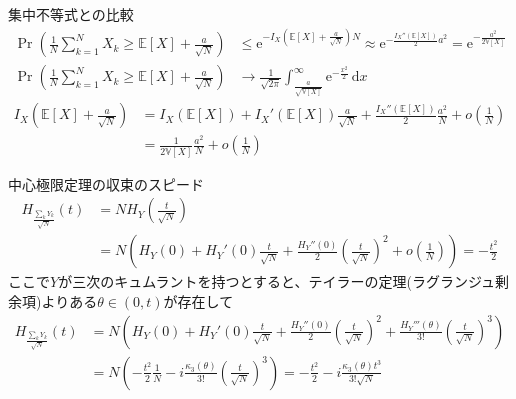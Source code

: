 \documentclass[lualatex,handout]{beamer}
\newcommand{\expt}[1]{\mathbb{E}\left[#1\right]}
\newcommand{\var}[1]{\mathbb{V}\left[#1\right]}
\newcommand\dx{{\,\mathrm{d}x}}
\theoremstyle{definition}
\begin{document}
\begin{frame}{集中不等式との比較}
\begin{align*}
\Pr\left(\frac1N\sum_{k=1}^N X_k\ge \expt{X} + \frac{a}{\sqrt{N}}\right) &\le \mathrm{e}^{-I_X\left(\expt{X}+\frac{a}{\sqrt{N}}\right)N}
\approx \mathrm{e}^{-\frac{I_X''(\expt{X})}2 a^2}
= \mathrm{e}^{-\frac{a^2}{2\var{X}}}\\
\Pr\left(\frac1N\sum_{k=1}^N X_k\ge \expt{X} + \frac{a}{\sqrt{N}}\right) &\to 
\frac1{\sqrt{2\pi}}\int_{\frac{a}{\sqrt{\var{X}}}}^\infty \mathrm{e}^{-\frac{x^2}2}\dx
\end{align*}
\begin{align*}
I_X\left(\expt{X}+\frac{a}{\sqrt{N}}\right)&=I_X(\expt{X}) + I_X'(\expt{X})\frac{a}{\sqrt{N}} + \frac{I_X''(\expt{X})}2\frac{a^2}N + o\left(\frac1N\right)\\
&= \frac1{2\var{X}}\frac{a^2}N + o\left(\frac1N\right)
\end{align*}
\end{frame}
\fi

\begin{frame}{中心極限定理の収束のスピード}
\begin{align*}
H_{\frac{\sum_kY_k}{\sqrt{N}}}(t) &= 
NH_Y\left(\frac{t}{\sqrt{N}}\right)\\
&=N\left(H_Y(0) + H_Y'(0)\frac{t}{\sqrt{N}} + \frac{H_Y''(0)}2\left(\frac{t}{\sqrt{N}}\right)^2 + o\left(\frac{1}{N}\right)\right)
= -\frac{t^2}2
\end{align*}
ここで$Y$が三次のキュムラントを持つとすると、テイラーの定理(ラグランジュ剰余項)よりある$\theta\in(0,t)$が存在して
\begin{align*}
H_{\frac{\sum_kY_k}{\sqrt{N}}}(t) &= 
N\left(H_Y(0) + H_Y'(0)\frac{t}{\sqrt{N}} + \frac{H_Y''(0)}2\left(\frac{t}{\sqrt{N}}\right)^2 + \frac{H_Y'''(\theta)}{3!} \left(\frac{t}{\sqrt{N}}\right)^3\right)\\
&=N\left(-\frac{t^2}2\frac1N - i\frac{\kappa_3(\theta)}{3!} \left(\frac{t}{\sqrt{N}}\right)^3\right)
=-\frac{t^2}2 - i\frac{\kappa_3(\theta)t^3}{3!\sqrt{N}}
\end{align*}
\end{frame}
\end{document}
